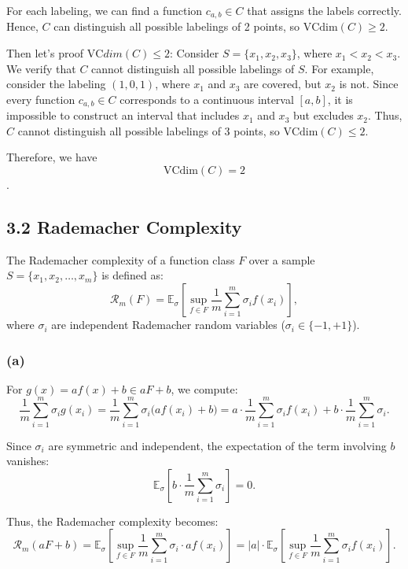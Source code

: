 \documentclass[12pt]{article}
\begin{document}
For each labeling, we can find a function \( c_{a,b} \in C \) that assigns the labels correctly. Hence, \( C \) can distinguish all possible labelings of 2 points, so \( \text{VCdim}(C) \geq 2 \).

Then let's proof $\text{VC}dim(C)\le 2$:
Consider \( S = \{x_1, x_2, x_3\} \), where \( x_1 < x_2 < x_3 \). We verify that \( C \) cannot distinguish all possible labelings of \( S \). 
For example, consider the labeling \( (1, 0, 1) \), where \( x_1 \) and \( x_3 \) are covered, but \( x_2 \) is not. 
Since every function \( c_{a,b} \in C \) corresponds to a continuous interval \([a, b]\), it is impossible to construct an interval that includes \( x_1 \) and \( x_3 \) but excludes \( x_2 \).
Thus, \( C \) cannot distinguish all possible labelings of 3 points, so \( \text{VCdim}(C) \leq 2 \).

Therefore, we have 
\[ \text{VCdim}(C) = 2 \].

\subsection*{3.2 Rademacher Complexity}

The Rademacher complexity of a function class \( F \) over a sample \( S = \{x_1, x_2, \dots, x_m\} \) is defined as:
\[
\mathcal{R}_m(F) = \mathbb{E}_\sigma \left[ \sup_{f \in F} \frac{1}{m} \sum_{i=1}^m \sigma_i f(x_i) \right],
\]
where \( \sigma_i \) are independent Rademacher random variables (\( \sigma_i \in \{-1, +1\} \)).

\subsubsection*{(a)}

For \( g(x) = af(x) + b \in aF + b \), we compute:
\[
\frac{1}{m} \sum_{i=1}^m \sigma_i g(x_i) = \frac{1}{m} \sum_{i=1}^m \sigma_i \big( af(x_i) + b \big) = a \cdot \frac{1}{m} \sum_{i=1}^m \sigma_i f(x_i) + b \cdot \frac{1}{m} \sum_{i=1}^m \sigma_i.
\]

Since \( \sigma_i \) are symmetric and independent, the expectation of the term involving \( b \) vanishes:
\[
\mathbb{E}_\sigma \left[ b \cdot \frac{1}{m} \sum_{i=1}^m \sigma_i \right] = 0.
\]

Thus, the Rademacher complexity becomes:
\[
\mathcal{R}_m(aF + b) = \mathbb{E}_\sigma \left[ \sup_{f \in F} \frac{1}{m} \sum_{i=1}^m \sigma_i \cdot a f(x_i) \right] = |a| \cdot \mathbb{E}_\sigma \left[ \sup_{f \in F} \frac{1}{m} \sum_{i=1}^m \sigma_i f(x_i) \right].
\]
\end{document}
